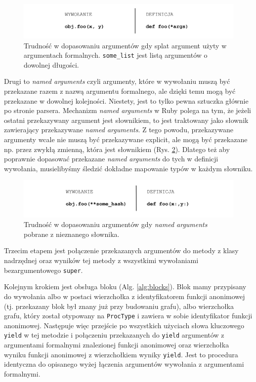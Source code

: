 \documentclass[declaration,shortabstract,mgr]{iithesis}
\begin{document}
\begin{figure}[htb]
	\centering
	\includegraphics[scale=0.6]{imgs/formal-splat.png}
	\caption{Trudność w dopasowaniu argumentów gdy splat argument użyty w argumentach formalnych. 	\texttt{some\_list} jest listą argumentów o dowolnej długości.}
	\label{fig:formal-splat}
\end{figure}

Drugi to \textit{named arguments} czyli argumenty, które w wywołaniu muszą być przekazane razem z nazwą argumentu formalnego, ale dzięki temu mogą być przekazane w dowolnej kolejności. Niestety, jest to tylko pewna sztuczka głównie po stronie parsera. Mechanizm \textit{named arguments} w Ruby polega na tym, że jeżeli ostatni przekazywany argument jest słownikiem, to jest traktowany jako słownik zawierający przekazywane \textit{named arguments}. Z tego powodu, przekazywane argumenty wcale nie muszą być przekazywane explicit, ale mogą być przekazane np. przez zwykłą zmienną, która jest słownikiem (Rys. \ref{fig:named-args}). Dlatego też aby poprawnie dopasować przekazane \textit{named arguments} do tych w definicji wywołania, musielibyśmy śledzić dokładne mapowanie typów w każdym słowniku.

\begin{figure}[htb]
	\centering
	\includegraphics[scale=0.6]{imgs/named-args.png}
	\caption{Trudność w dopasowaniu argumentów gdy \emph{named arguments} pobrane z nieznanego słownika.}
	\label{fig:named-args}
\end{figure}

Trzecim etapem jest połączenie przekazanych argumentów do metody z klasy nadrzędnej oraz wyników tej metody z wszystkimi wywołaniami bezargumentowego \texttt{super}.

Kolejnym krokiem jest obsługa bloku (Alg. \ref{alg:blocks}). Blok mamy przypisany do wywołania albo w postaci wierzchołka z identyfikatorem funkcji anonimowej (tj. przekazany blok był znany już przy budowaniu grafu), albo wierzchołka grafu, który został otypowany na \texttt{ProcType} i zawiera w sobie identyfikator funkcji anonimowej. Następuje więc przejście po wszystkich użyciach słowa kluczowego \texttt{yield} w tej metodzie i połączeniu przekazanych do \texttt{yield} argumentów z argumentami formalnymi znalezionej funkcji anonimowej oraz wierzchołka wyniku funkcji anonimowej z wierzchołkiem wyniky \texttt{yield}. Jest to procedura identyczna do opisanego wyżej łączenia argumentów wywołania z argumentami formalnymi.
\end{document}
